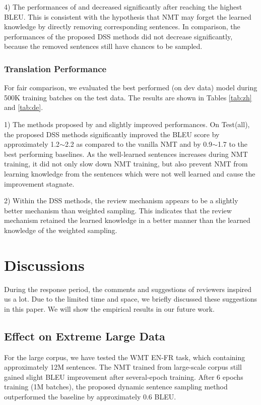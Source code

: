 \documentclass[11pt,a4paper]{article}
\begin{document}
4) The performances of \citet{DBLP:journals/corr/KocmiB17aa} and \citet{zhang-EtAl:2017:I17-2} decreased significantly after reaching the highest BLEU. This is consistent with the hypothesis that NMT may forget  the learned knowledge by directly removing corresponding sentences. In comparison, the performances of the proposed DSS methods did not decrease significantly, because the removed sentences still have chances to be sampled.


\subsubsection{Translation Performance}
For fair comparison, we evaluated the best performed (on dev data) model during 500K training  batches on the test data. The results are shown in Tables \ref{tab:zh} and \ref{tab:de}.


1) The methods proposed by \citet{vanderwees-bisazza-monz:2017:EMNLP2017} and \citet{zhang-EtAl:2017:I17-2} slightly improved performances. On Test(all), the proposed DSS methods significantly improved the BLEU score by approximately 1.2$\sim$2.2 as compared to the vanilla NMT and by 0.9$\sim$1.7 to the best performing baselines.  As the well-learned sentences increases during NMT training, it did not only slow down NMT training, but also prevent NMT from learning knowledge from the sentences which were not well learned and cause the improvement stagnate. 

2) Within the DSS methods, the review mechanism appears to be a slightly better mechanism than  weighted sampling. This indicates that the review mechanism retained the learned knowledge in a better manner than the learned knowledge of the weighted sampling.


\section{Discussions}
\label{sec:dis}
During the response period, the comments and suggestions of reviewers inspired us a lot. Due to the limited time and space, we briefly discussed these suggestions in this paper. We will show the empirical results in our future work.


\subsection{Effect on Extreme Large Data}
\label{sec:el}
For the large corpus, we have tested the WMT EN-FR task, which containing approximately 12M sentences. The NMT trained from large-scale corpus still gained slight BLEU improvement after several-epoch training.  After 6 epochs training (1M batches), the proposed dynamic sentence sampling method outperformed the baseline by approximately 0.6 BLEU.  
\end{document}
